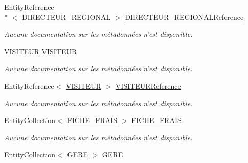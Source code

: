 \begin{DoxyCompactItemize}
Entity\-Reference\\*
$<$ \hyperlink{class_model_1_1_d_i_r_e_c_t_e_u_r___r_e_g_i_o_n_a_l}{D\-I\-R\-E\-C\-T\-E\-U\-R\-\_\-\-R\-E\-G\-I\-O\-N\-A\-L} $>$ \hyperlink{class_model_1_1_c_o_l_l_a_b_o_r_a_t_e_u_r_a3afe8c2d48548ecbb9b2ec038bf71824}{D\-I\-R\-E\-C\-T\-E\-U\-R\-\_\-\-R\-E\-G\-I\-O\-N\-A\-L\-Reference}
\begin{DoxyCompactList}\small\item\em Aucune documentation sur les métadonnées n'est disponible. \end{DoxyCompactList}\item 
\hyperlink{class_model_1_1_v_i_s_i_t_e_u_r}{V\-I\-S\-I\-T\-E\-U\-R} \hyperlink{class_model_1_1_c_o_l_l_a_b_o_r_a_t_e_u_r_a26d90f7ca8e82c6068ce5b62edf893c5}{V\-I\-S\-I\-T\-E\-U\-R}
\begin{DoxyCompactList}\small\item\em Aucune documentation sur les métadonnées n'est disponible. \end{DoxyCompactList}\item 
Entity\-Reference$<$ \hyperlink{class_model_1_1_v_i_s_i_t_e_u_r}{V\-I\-S\-I\-T\-E\-U\-R} $>$ \hyperlink{class_model_1_1_c_o_l_l_a_b_o_r_a_t_e_u_r_a480fc3f4e938e8e0211622b9f6d4dd14}{V\-I\-S\-I\-T\-E\-U\-R\-Reference}
\begin{DoxyCompactList}\small\item\em Aucune documentation sur les métadonnées n'est disponible. \end{DoxyCompactList}\item 
Entity\-Collection$<$ \hyperlink{class_model_1_1_f_i_c_h_e___f_r_a_i_s}{F\-I\-C\-H\-E\-\_\-\-F\-R\-A\-I\-S} $>$ \hyperlink{class_model_1_1_c_o_l_l_a_b_o_r_a_t_e_u_r_a22af8667a48d207688fa85b70ae69b62}{F\-I\-C\-H\-E\-\_\-\-F\-R\-A\-I\-S}
\begin{DoxyCompactList}\small\item\em Aucune documentation sur les métadonnées n'est disponible. \end{DoxyCompactList}\item 
Entity\-Collection$<$ \hyperlink{class_model_1_1_g_e_r_e}{G\-E\-R\-E} $>$ \hyperlink{class_model_1_1_c_o_l_l_a_b_o_r_a_t_e_u_r_a09aa4348c01e391b24c2ec4134060e0b}{G\-E\-R\-E}

\end{DoxyCompactItemize}
